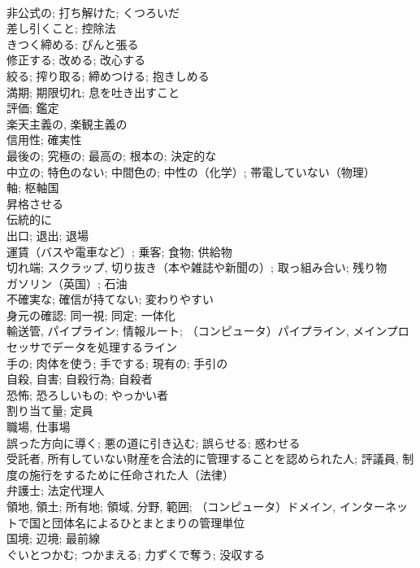 \documentclass[8pt]{extreport}
\begin{document}
\begin{CJK}{UTF8}{min}
\\	非公式の; 打ち解けた; くつろいだ	
\\	差し引くこと; 控除法	
\\	きつく締める; ぴんと張る	
\\	修正する; 改める; 改心する	
\\	絞る; 搾り取る; 締めつける; 抱きしめる	
\\	満期; 期限切れ; 息を吐き出すこと	
\\	評価; 鑑定	
\\	楽天主義の, 楽観主義の	
\\	信用性; 確実性	
\\	最後の; 究極の; 最高の; 根本の; 決定的な	
\\	中立の; 特色のない; 中間色の; 中性の（化学）; 帯電していない（物理）	
\\	軸; 枢軸国	
\\	昇格させる	
\\	伝統的に	
\\	出口; 退出; 退場	
\\	運賃（バスや電車など）; 乗客; 食物; 供給物	
\\	切れ端; スクラップ, 切り抜き（本や雑誌や新聞の）; 取っ組み合い; 残り物	
\\	ガソリン（英国）; 石油	
\\	不確実な; 確信が持てない; 変わりやすい	
\\	身元の確認; 同一視; 同定; 一体化	
\\	輸送管, パイプライン; 情報ルート; （コンピュータ）パイプライン, メインプロセッサでデータを処理するライン	
\\	手の; 肉体を使う; 手でする; 現有の; 手引の	
\\	自殺, 自害; 自殺行為; 自殺者	
\\	恐怖; 恐ろしいもの; やっかい者	
\\	割り当て量; 定員	
\\	職場, 仕事場	
\\	誤った方向に導く; 悪の道に引き込む; 誤らせる; 惑わせる	
\\	受託者, 所有していない財産を合法的に管理することを認められた人; 評議員, 制度の施行をするために任命された人（法律）	
\\	弁護士; 法定代理人	
\\	領地, 領土; 所有地; 領域, 分野, 範囲; （コンピュータ）ドメイン, インターネットで国と団体名によるひとまとまりの管理単位	
\\	国境; 辺境; 最前線	
\\	ぐいとつかむ; つかまえる; 力ずくで奪う; 没収する	

\end{CJK}
\end{document}
